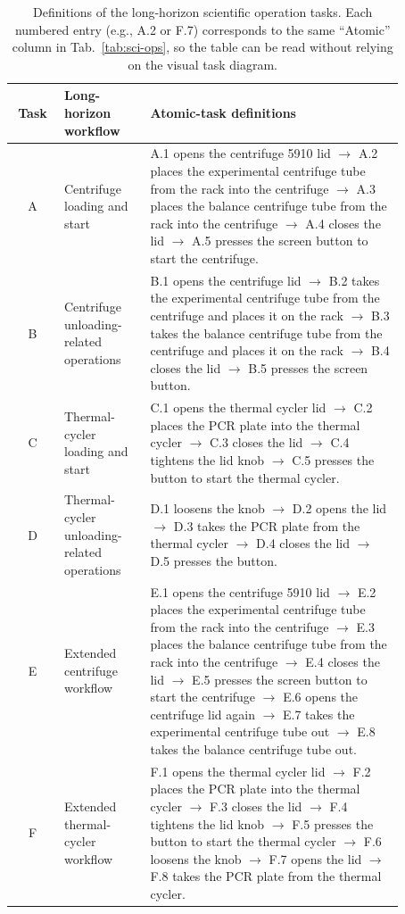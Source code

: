 \documentclass[letterpaper]{article} %
\begin{document}
\begin{table}[!t]
\small
\begin{tabular}{cp{0.22\linewidth}p{0.65\linewidth}}
\toprule
Task & Long-horizon workflow & Atomic-task definitions \\
\midrule
A & Centrifuge loading and start &
A.1 opens the centrifuge 5910 lid $\rightarrow$ A.2 places the experimental centrifuge tube from the rack into the centrifuge $\rightarrow$ A.3 places the balance centrifuge tube from the rack into the centrifuge $\rightarrow$ A.4 closes the lid $\rightarrow$ A.5 presses the screen button to start the centrifuge. \\
\midrule
B & Centrifuge unloading-related operations &
B.1 opens the centrifuge lid $\rightarrow$ B.2 takes the experimental centrifuge tube from the centrifuge and places it on the rack $\rightarrow$ B.3 takes the balance centrifuge tube from the centrifuge and places it on the rack $\rightarrow$ B.4 closes the lid $\rightarrow$ B.5 presses the screen button. \\
\midrule
C & Thermal-cycler loading and start &
C.1 opens the thermal cycler lid $\rightarrow$ C.2 places the PCR plate into the thermal cycler $\rightarrow$ C.3 closes the lid $\rightarrow$ C.4 tightens the lid knob $\rightarrow$ C.5 presses the button to start the thermal cycler. \\
\midrule
D & Thermal-cycler unloading-related operations &
D.1 loosens the knob $\rightarrow$ D.2 opens the lid $\rightarrow$ D.3 takes the PCR plate from the thermal cycler $\rightarrow$ D.4 closes the lid $\rightarrow$ D.5 presses the button. \\
\midrule
E & Extended centrifuge workflow &
E.1 opens the centrifuge 5910 lid $\rightarrow$ E.2 places the experimental centrifuge tube from the rack into the centrifuge $\rightarrow$ E.3 places the balance centrifuge tube from the rack into the centrifuge $\rightarrow$ E.4 closes the lid $\rightarrow$ E.5 presses the screen button to start the centrifuge $\rightarrow$ E.6 opens the centrifuge lid again $\rightarrow$ E.7 takes the experimental centrifuge tube out $\rightarrow$ E.8 takes the balance centrifuge tube out. \\
\midrule
F & Extended thermal-cycler workflow &
F.1 opens the thermal cycler lid $\rightarrow$ F.2 places the PCR plate into the thermal cycler $\rightarrow$ F.3 closes the lid $\rightarrow$ F.4 tightens the lid knob $\rightarrow$ F.5 presses the button to start the thermal cycler $\rightarrow$ F.6 loosens the knob $\rightarrow$ F.7 opens the lid $\rightarrow$ F.8 takes the PCR plate from the thermal cycler. \\
\bottomrule
\end{tabular}
\caption{Definitions of the long-horizon scientific operation tasks. Each numbered entry (e.g., A.2 or F.7) corresponds to the same ``Atomic'' column in Tab.~\ref{tab:sci-ops}, so the table can be read without relying on the visual task diagram.}
\label{tab:long_task_definitions}
\end{table}
\end{document}
